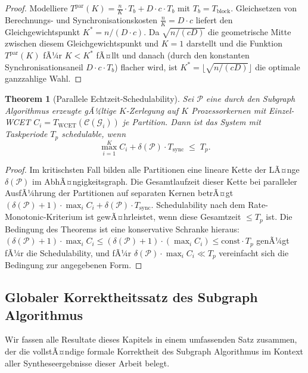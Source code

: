 ﻿\documentclass[12pt,a4paper]{article}
\newtheorem{theorem}{Theorem}[section]
\theoremstyle{definition}
\begin{document}
\begin{proof}
Modelliere $T^{\mathrm{par}}(K) = \frac{n}{K} \cdot T_b + D \cdot c \cdot T_b$
mit $T_b = T_{\mathrm{block}}$. Gleichsetzen von Berechnungs- und
Synchronisationskosten $\frac{n}{K} = D \cdot c$ liefert den
Gleichgewichtspunkt $K^* = n / (D \cdot c)$. Da $\sqrt{n/(cD)}$ die
geometrische Mitte zwischen diesem Gleichgewichtspunkt und $K = 1$
darstellt und die Funktion $T^{\mathrm{par}}(K)$ fÃ¼r $K < K^*$ fÃ¤llt
und danach (durch den konstanten Synchronisationsaneil $D \cdot c \cdot T_b$)
flacher wird, ist $K^* = \lfloor\sqrt{n/(cD)}\rfloor$ die optimale
ganzzahlige Wahl.
\end{proof}

\begin{theorem}[Parallele Echtzeit-Schedulability]
\label{thm:par-schedule}
Sei $\mathcal{P}$ eine durch den Subgraph Algorithmus erzeugte gÃ¼ltige
$K$-Zerlegung auf $K$ Prozessorkernen mit Einzel-WCET
$C_i = T_{\mathrm{WCET}}(\mathcal{C}(\mathcal{G}_i))$ je Partition.
Dann ist das System mit Taskperiode $T_p$ schedulable, wenn
\[
  \max_{i=1}^K C_i + \delta(\mathcal{P}) \cdot T_{\mathrm{sync}}
  \;\leq\;
  T_p.
\]
\end{theorem}

\begin{proof}
Im kritischsten Fall bilden alle Partitionen eine lineare Kette der LÃ¤nge
$\delta(\mathcal{P})$ im AbhÃ¤ngigkeitsgraph. Die Gesamtlaufzeit dieser
Kette bei paralleler AusfÃ¼hrung der Partitionen auf separaten Kernen
betrÃ¤gt $(\delta(\mathcal{P})+1) \cdot \max_i C_i + \delta(\mathcal{P})
\cdot T_{\mathrm{sync}}$.
Schedulability nach dem Rate-Monotonic-Kriterium \cite{liu1973} ist
gewÃ¤hrleistet, wenn diese Gesamtzeit $\leq T_p$ ist. Die Bedingung des
Theorems ist eine konservative Schranke hieraus:
$(\delta(\mathcal{P})+1) \cdot \max_i C_i \leq
(\delta(\mathcal{P})+1) \cdot (\max_i C_i) \leq
\text{const} \cdot T_p$ genÃ¼gt fÃ¼r die Schedulability, und fÃ¼r
$\delta(\mathcal{P}) \cdot \max_i C_i \ll T_p$ vereinfacht sich
die Bedingung zur angegebenen Form.
\end{proof}

\subsection{Globaler Korrektheitssatz des Subgraph Algorithmus}
\label{subsec:subgraph-global}

Wir fassen alle Resultate dieses Kapitels in einem umfassenden Satz zusammen,
der die vollstÃ¤ndige formale Korrektheit des Subgraph Algorithmus im
Kontext aller Syntheseergebnisse dieser Arbeit belegt.
\end{document}

